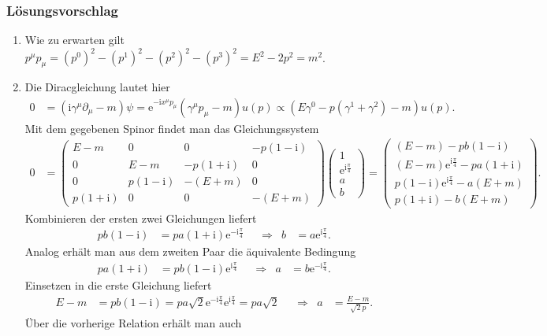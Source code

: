 \documentclass[german, parskip=full]{scrartcl}
\newcommand{\I}{\text{i}}
\newcommand{\e}{\text{e}}
\begin{document}
\subsubsection*{Lösungsvorschlag}
\begin{enumerate}
\item[a)] Wie zu erwarten gilt $p^\mu p_\mu = (p^0)^2-(p^1)^2-(p^2)^2-(p^3)^2=E^2-2p^2=m^2$. 
\item[b)] Die Diracgleichung lautet hier
\begin{align*}
0&=(\I\gamma^\mu\partial_\mu -m)\psi=\e^{-\I x^\mu p_\mu}(\gamma^\mu p_\mu -m)u(p)\propto (E\gamma^0-p(\gamma^1+\gamma^2)-m)u(p).
\end{align*}
Mit dem gegebenen Spinor findet man das Gleichungssystem
\begin{align*}
0&=\begin{pmatrix}
E-m&0&0&-p(1-\I)\\
0&E-m&-p(1+\I)&0\\
0&p(1-\I)&-(E+m)&0\\
p(1+\I)&0&0&-(E+m)
\end{pmatrix}\begin{pmatrix}
1\\ \e^{\I\frac{\pi}{4}}\\ a\\ b
\end{pmatrix}=\begin{pmatrix}
(E-m)-pb(1-\I)\\ (E-m)\e^{\I\frac{\pi}{4}}-pa(1+\I)\\ p(1-\I)\e^{\I\frac{\pi}{4}}-a(E+m)\\ p(1+\I) -b(E+m)
\end{pmatrix}.
\end{align*}
Kombinieren der ersten zwei Gleichungen liefert
\begin{align*}
pb(1-\I)&=pa(1+\I)\e^{-\I\frac{\pi}{4}}&&\Rightarrow &b&=a\e^{\I\frac{\pi}{4}}.
\end{align*}
Analog erhält man aus dem zweiten Paar die äquivalente Bedingung
\begin{align*}
pa(1+\I)&=pb(1-\I)\e^{\I\frac{\pi}{4}}&&\Rightarrow &a&=b\e^{-\I\frac{\pi}{4}}.
\end{align*}
Einsetzen in die erste Gleichung liefert
\begin{align*}
E-m&=pb(1-\I)=pa\sqrt{2}\e^{-\I\frac{\pi}{4}}\e^{\I\frac{\pi}{4}}=pa\sqrt{2}&&\Rightarrow &a&=\frac{E-m}{\sqrt{2}p}.
\end{align*}
Über die vorherige Relation erhält man auch
\begin{align*}

\end{align*}
\end{enumerate}
\end{document}
